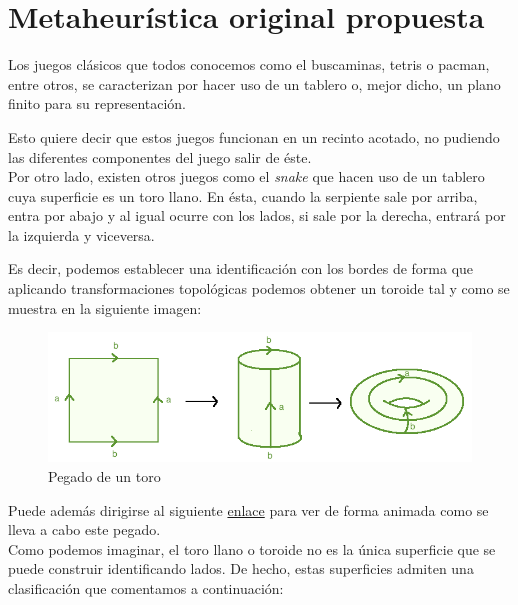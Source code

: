 \newpage 
\section{Metaheurística original propuesta}

Los juegos clásicos que todos conocemos como el buscaminas, tetris o pacman, entre otros, se caracterizan por hacer uso de un tablero o, mejor dicho, un plano finito para su representación.

Esto quiere decir que estos juegos funcionan en un recinto acotado, no pudiendo las diferentes componentes del juego salir de éste. \\

Por otro lado, existen otros juegos como el \textit{snake} que hacen uso de un tablero cuya superficie es un toro llano. En ésta, cuando la serpiente sale por arriba, entra por abajo y al igual ocurre con los lados, si sale por la derecha, entrará por la izquierda y viceversa.

Es decir, podemos establecer una identificación con los bordes de forma que aplicando transformaciones topológicas podemos obtener un toroide tal y como se muestra en la siguiente imagen:

\begin{figure}[H]
	\centering
	\includegraphics[scale=0.35]{img/toro.png}
	\caption{Pegado de un toro}
	\label{toro}
\end{figure}

Puede además dirigirse al siguiente \href{https://www.youtube.com/watch?v=0KwGE6hAtGc}{enlace} para ver de forma animada como se lleva a cabo este pegado. \\

Como podemos imaginar, el toro llano o toroide no es la única superficie que se puede construir identificando lados. De hecho, estas superficies admiten una clasificación que comentamos a continuación:


